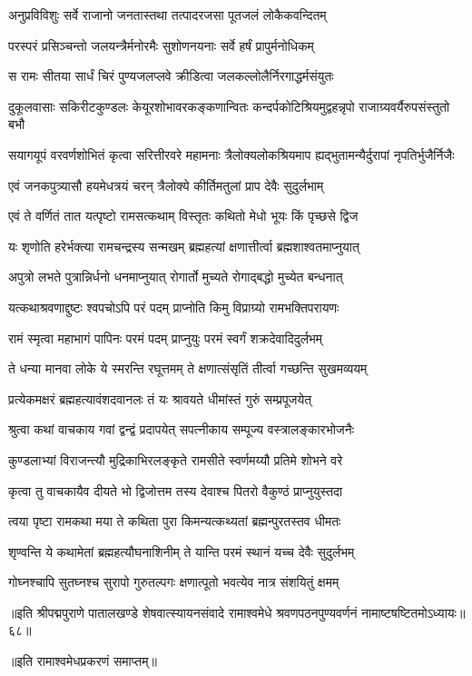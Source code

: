 \twolineshloka
{अनुप्रविविशुः सर्वे राजानो जनतास्तथा}
{तत्पादरजसा पूतजलं लोकैकवन्दितम्}%

\twolineshloka
{परस्परं प्रसिञ्चन्तो जलयन्त्रैर्मनोरमैः}
{सुशोणनयनाः सर्वे हर्षं प्रापुर्मनोधिकम्}%

\twolineshloka
{स रामः सीतया सार्धं चिरं पुण्यजलप्लवे}
{क्रीडित्वा जलकल्लोलैर्निरगाद्धर्मसंयुतः}%

\twolineshloka
{दुकूलवासाः सकिरीटकुण्डलः केयूरशोभावरकङ्कणान्वितः}
{कन्दर्पकोटिश्रियमुद्वहन्नृपो राजाग्र्यवर्यैरुपसंस्तुतो बभौ}%

\twolineshloka
{सयागयूपं वरवर्णशोभितं कृत्वा सरित्तीरवरे महामनाः}
{त्रैलोक्यलोकश्रियमाप ह्यद्भुतामन्यैर्दुरापां नृपतिर्भुजैर्निजैः}%

\twolineshloka
{एवं जनकपुत्र्यासौ हयमेधत्रयं चरन्}
{त्रैलोक्ये कीर्तिमतुलां प्राप देवैः सुदुर्लभाम्}%

\twolineshloka
{एवं ते वर्णितं तात यत्पृष्टो रामसत्कथाम्}
{विस्तृतः कथितो मेधो भूयः किं पृच्छसे द्विज}%

\twolineshloka
{यः शृणोति हरेर्भक्त्या रामचन्द्रस्य सन्मखम्}
{ब्रह्महत्यां क्षणात्तीर्त्वा ब्रह्मशाश्वतमाप्नुयात्}%

\twolineshloka
{अपुत्रो लभते पुत्रान्निर्धनो धनमाप्नुयात्}
{रोगार्तो मुच्यते रोगाद्बद्धो मुच्येत बन्धनात्}%

\twolineshloka
{यत्कथाश्रवणाद्दुष्टः श्वपचोऽपि परं पदम्}
{प्राप्नोति किमु विप्राग्र्यो रामभक्तिपरायणः}%

\twolineshloka
{रामं स्मृत्वा महाभागं पापिनः परमं पदम्}
{प्राप्नुयुः परमं स्वर्गं शक्रदेवादिदुर्लभम्}%

\twolineshloka
{ते धन्या मानवा लोके ये स्मरन्ति रघूत्तमम्}
{ते क्षणात्संसृतिं तीर्त्वा गच्छन्ति सुखमव्ययम्}%

\twolineshloka
{प्रत्येकमक्षरं ब्रह्महत्यावंशदवानलः}
{तं यः श्रावयते धीमांस्तं गुरुं सम्प्रपूजयेत्}%

\twolineshloka
{श्रुत्वा कथां वाचकाय गवां द्वन्द्वं प्रदापयेत्}
{सपत्नीकाय सम्पूज्य वस्त्रालङ्कारभोजनैः}%

\twolineshloka
{कुण्डलाभ्यां विराजन्त्यौ मुद्रिकाभिरलङ्कृते}
{रामसीते स्वर्णमय्यौ प्रतिमे शोभने वरे}%

\twolineshloka
{कृत्वा तु वाचकायैव दीयते भो द्विजोत्तम}
{तस्य देवाश्च पितरो वैकुण्ठं प्राप्नुयुस्तदा}%

\twolineshloka
{त्वया पृष्टा रामकथा मया ते कथिता पुरा}
{किमन्यत्कथ्यतां ब्रह्मन्पुरतस्तव धीमतः}%

\twolineshloka
{शृण्वन्ति ये कथामेतां ब्रह्महत्यौघनाशिनीम्}
{ते यान्ति परमं स्थानं यच्च देवैः सुदुर्लभम्}%

\twolineshloka
{गोघ्नश्चापि सुतघ्नश्च सुरापो गुरुतल्पगः}
{क्षणात्पूतो भवत्येव नात्र संशयितुं क्षमम्}%

{॥इति श्रीपद्मपुराणे पातालखण्डे शेषवात्स्यायनसंवादे रामाश्वमेधे श्रवणपठनपुण्यवर्णनं नामाष्टषष्टितमोऽध्यायः॥६८॥}

{॥इति रामाश्वमेधप्रकरणं समाप्तम्॥}
